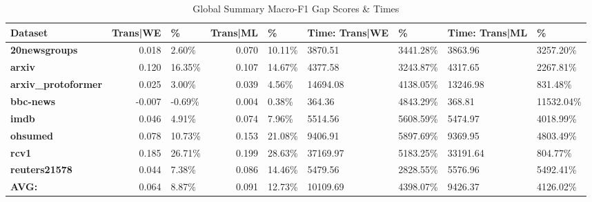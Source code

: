 \documentclass[final]{clv2025}
\begin{document}
\begin{table}[h!]
\centering
\scriptsize
\caption{Global Summary Macro-F1 Gap Scores \& Times}
\label{tab:macro_f1_gap_summary}
\begin{tabular}{@{}p{1.3cm} r p{1cm} r p{1cm} p{1cm} p{1cm} p{1cm} p{1.1cm}@{}}
\toprule
\textbf{Dataset} & \textbf{Trans|WE} & \textbf{\%} & \textbf{Trans|ML} & \textbf{\%} & \textbf{Time: Trans|WE} & \textbf{\%} & \textbf{Time: Trans|ML} & \textbf{\%} \\
\midrule
\textbf{20newsgroups}      & 0.018 & 2.60\%  & 0.070 & 10.11\% & 3870.51 & 3441.28\% & 3863.96 & 3257.20\% \\
\textbf{arxiv}             & 0.120 & 16.35\% & 0.107 & 14.67\% & 4377.58 & 3243.87\% & 4317.65 & 2267.81\% \\
\textbf{arxiv\_protoformer}& 0.025 & 3.00\%  & 0.039 & 4.56\%  & 14694.08 & 4138.05\% & 13246.98 & 831.48\% \\
\textbf{bbc-news}          & -0.007 & -0.69\% & 0.004 & 0.38\% & 364.36 & 4843.29\% & 368.81 & 11532.04\% \\
\textbf{imdb}              & 0.046 & 4.91\%  & 0.074 & 7.96\%  & 5514.56 & 5608.59\% & 5474.97 & 4018.99\% \\
\textbf{ohsumed}           & 0.078 & 10.73\% & 0.153 & 21.08\% & 9406.91 & 5897.69\% & 9369.95 & 4803.49\% \\
\textbf{rcv1}              & 0.185 & 26.71\% & 0.199 & 28.63\% & 37169.97 & 5183.25\% & 33191.64 & 804.77\% \\
\textbf{reuters21578}      & 0.044 & 7.38\%  & 0.086 & 14.46\% & 5479.56 & 2828.55\% & 5576.96 & 5492.41\% \\
\midrule
\textbf{AVG:}              & 0.064 & 8.87\%  & 0.091 & 12.73\% & 10109.69 & 4398.07\% & 9426.37 & 4126.02\% \\
\bottomrule
\end{tabular}
\end{table}
\end{document}
